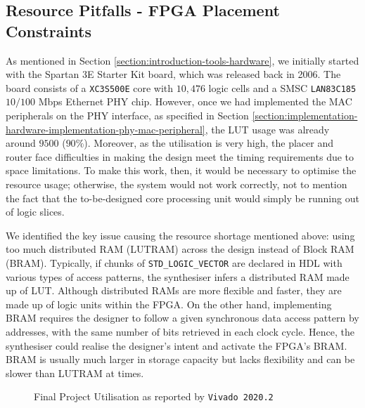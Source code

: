 \documentclass[a4paper]{report}
\newcommand{\code}{\texttt}
\begin{document}
\subsection{Resource Pitfalls - FPGA Placement Constraints}

As mentioned in Section \ref{section:introduction-tools-hardware}, we initially started with the Spartan 3E Starter Kit board, which was released back in 2006. The board consists of a \code{XC3S500E} core with $10,476$ logic cells \cite{xilinx-documentation-2011-core} and a SMSC \code{LAN83C185} $10/100$ Mbps Ethernet PHY chip. However, once we had implemented the MAC peripherals on the PHY interface, as specified in Section \ref{section:implementation-hardware-implementation-phy-mac-peripheral}, the LUT usage was already around $9500$ ($90\%$). Moreover, as the utilisation is very high, the placer and router face difficulties in making the design meet the timing requirements due to space limitations. To make this work, then, it would be necessary to optimise the resource usage; otherwise, the system would not work correctly, not to mention the fact that the to-be-designed core processing unit would simply be running out of logic slices. 

We identified the key issue causing the resource shortage mentioned above: using too much distributed RAM (LUTRAM) across the design instead of Block RAM (BRAM). Typically, if chunks of \code{STD\_LOGIC\_VECTOR} are declared in HDL with various types of access patterns, the synthesiser infers a distributed RAM made up of LUT. Although distributed RAMs are more flexible and faster, they are made up of logic units within the FPGA. On the other hand, implementing BRAM requires the designer to follow a given synchronous data access pattern by addresses, with the same number of bits retrieved in each clock cycle. Hence, the synthesiser could realise the designer's intent and activate the FPGA's BRAM. BRAM is usually much larger in storage capacity but lacks flexibility and can be slower than LUTRAM at times. 

\begin{figure}[h!]
  \caption{Final Project Utilisation as reported by \code{Vivado 2020.2}}
  \label{fig:utilisation-fpga}
\end{figure}
\end{document}
